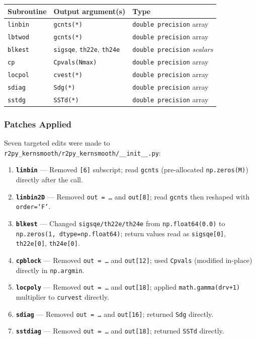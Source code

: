 \documentclass[12pt,a4paper]{article}
\begin{document}
\begin{center}
\begin{tabular}{lll}
\toprule
Subroutine & Output argument(s) & Type \\
\midrule
\texttt{linbin} & \texttt{gcnts(*)} & \texttt{double precision} array \\
\texttt{lbtwod} & \texttt{gcnts(*)} & \texttt{double precision} array \\
\texttt{blkest} & \texttt{sigsqe}, \texttt{th22e}, \texttt{th24e} &
  \texttt{double precision} \emph{scalars} \\
\texttt{cp}     & \texttt{Cpvals(Nmax)} & \texttt{double precision} array \\
\texttt{locpol} & \texttt{cvest(*)} & \texttt{double precision} array \\
\texttt{sdiag}  & \texttt{Sdg(*)} & \texttt{double precision} array \\
\texttt{sstdg}  & \texttt{SSTd(*)} & \texttt{double precision} array \\
\bottomrule
\end{tabular}
\end{center}

\subsubsection{Patches Applied}

Seven targeted edits were made to \texttt{r2py\_kernsmooth/r2py\_kernsmooth/\_\_init\_\_.py}:

\begin{enumerate}
  \item \textbf{\texttt{linbin}} --- Removed \texttt{[6]} subscript; read \texttt{gcnts} (pre-allocated \texttt{np.zeros(M)}) directly after the call.
  \item \textbf{\texttt{linbin2D}} --- Removed \texttt{out = \ldots} and \texttt{out[8]}; read \texttt{gcnts} then reshaped with \texttt{order=`F'}.
  \item \textbf{\texttt{blkest}} --- Changed \texttt{sigsqe/th22e/th24e} from \texttt{np.float64(0.0)} to \texttt{np.zeros(1, dtype=np.float64)}; return values read as \texttt{sigsqe[0]}, \texttt{th22e[0]}, \texttt{th24e[0]}.
  \item \textbf{\texttt{cpblock}} --- Removed \texttt{out = \ldots} and \texttt{out[12]}; used \texttt{Cpvals} (modified in-place) directly in \texttt{np.argmin}.
  \item \textbf{\texttt{locpoly}} --- Removed \texttt{out = \ldots} and \texttt{out[18]}; applied \texttt{math.gamma(drv+1)} multiplier to \texttt{curvest} directly.
  \item \textbf{\texttt{sdiag}} --- Removed \texttt{out = \ldots} and \texttt{out[16]}; returned \texttt{Sdg} directly.
  \item \textbf{\texttt{sstdiag}} --- Removed \texttt{out = \ldots} and \texttt{out[18]}; returned \texttt{SSTd} directly.
\end{enumerate}
\end{document}
